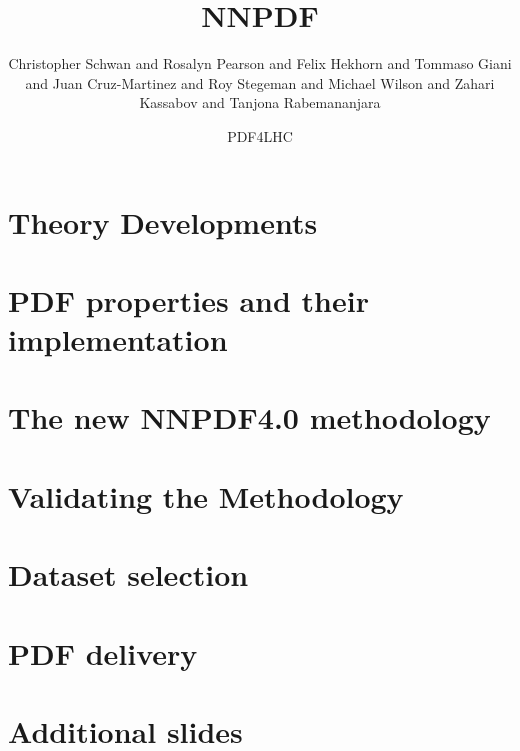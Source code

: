 \documentclass[xcolor={usenames,svgnames}]{beamer}
\author[NNPDF \& N3PDF]{
Christopher Schwan and
Rosalyn Pearson and
Felix Hekhorn and
Tommaso Giani and
Juan Cruz-Martinez and
Roy Stegeman and
Michael Wilson and
Zahari Kassabov and
Tanjona Rabemananjara
}
\title{NNPDF}
\date{PDF4LHC}
\author[\genericauthor]{} %
\institute{} %
\begin{document}
\section{Theory Developments}



\section{PDF properties and their implementation}



\section{The new NNPDF4.0 methodology}



\section{Validating the Methodology}



\section{Dataset selection}


\section{PDF delivery}


\section{Additional slides}






\end{document}
